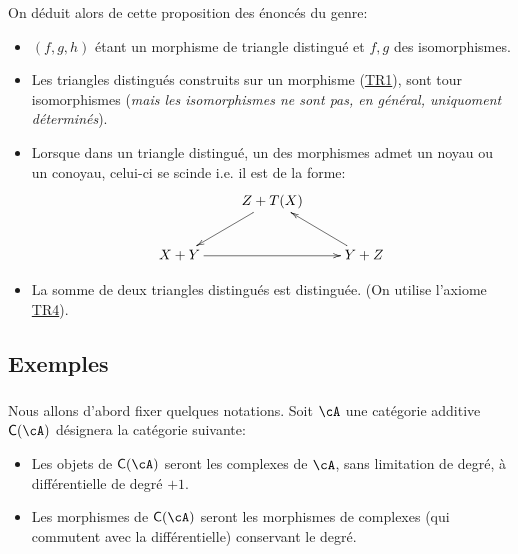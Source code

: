 On d\'eduit alors de cette proposition des \'enonc\'es du genre: 
\begin{itemize}
  \item $(f,g,h)$ \'etant un morphisme de triangle distingu\'e et $f,g$ des 
    isomorphismes. 
  \item Les triangles distingu\'es construits sur un morphisme 
    (\hyperlink{VIII:TR1}{TR1}), sont tour isomorphismes (\emph{mais les 
    isomorphismes ne sont pas, en g\'en\'eral, uniquoment d\'etermin\'es}). 
  \item Lorsque dans un triangle distingu\'e, un des morphismes admet un noyau 
    ou un conoyau, celui-ci se scinde i.e. il est de la forme: 
    \[\xymatrix{
      & Z+T(X) \ar[dl] \\
      X+Y \ar[rr] 
        & & Y+Z \ar[ul]
    }\]
  \item La somme de deux triangles distingu\'es est distingu\'ee. (On utilise 
    l'axiome \hyperlink{VIII:TR4}{TR4}). 
\end{itemize}










\subsection{Exemples}\label{VIII:1-2}





\subsubsection{}\label{VIII:1-2-1}

Nous allons d'abord fixer quelques notations. Soit $\cA$ une cat\'egorie 
additive $\eC(\cA)$ d\'esignera la cat\'egorie suivante: 
\begin{itemize}
  \item Les objets de $\eC(\cA)$ seront les complexes de $\cA$, sans limitation 
    de degr\'e, \`a diff\'erentielle de degr\'e $+1$. 
  \item Les morphismes de $\eC(\cA)$ seront les morphismes de complexes (qui 
    commutent avec la diff\'erentielle) conservant le degr\'e. 
\end{itemize}

